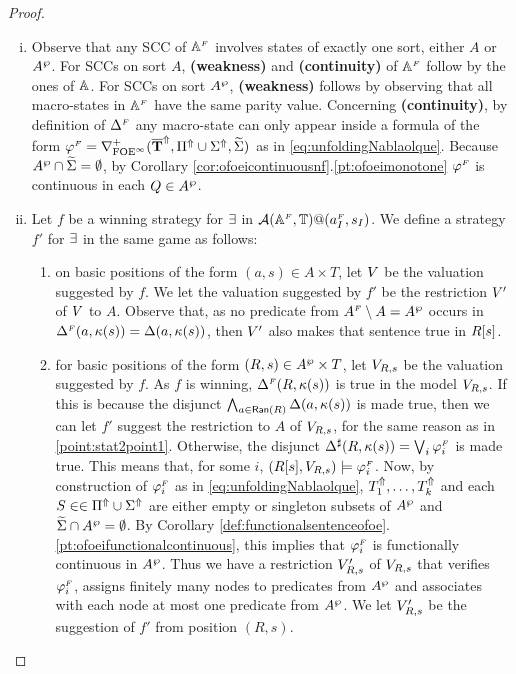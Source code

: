 \begin{proof}
\begin{enumerate}[(i)]
\item Observe that any SCC
of $\mathbb{A}^{{\scriptscriptstyle F}}$ involves states of exactly one sort, either $A$ or $A^{\wp}$. For SCCs on sort $A$, \textbf{(weakness)} and \textbf{(continuity)} of $\mathbb{A}^{{\scriptscriptstyle F}}$ follow by the ones of $\mathbb{A}$. For SCCs on sort $A^{\wp}$, \textbf{(weakness)} follows by observing that all macro-states in $\mathbb{A}^{{\scriptscriptstyle F}}$ have the same parity value. Concerning \textbf{(continuity)}, by definition of $\Delta^{{\scriptscriptstyle F}}$ any macro-state can only appear inside a formula of the form $\varphi^{{\scriptscriptstyle F}} = \nabla^+_{\mathrm{FOE}^{\infty}}(\overline{{\mathbf{T}}}^{\Uparrow},\Pi^{\Uparrow} \cup \Sigma^{\Uparrow},\widetilde{\Sigma})$ as in \eqref{eq:unfoldingNablaolque}. Because $A^{\wp} \cap \widetilde{\Sigma} = \emptyset$, by Corollary \ref{cor:ofoeicontinuousnf}.\ref{pt:ofoeimonotone} $\varphi^{{\scriptscriptstyle F}}$ is continuous in each $Q \in A^{\wp}$.
  \item  Let $f$ be a winning strategy for $\exists$ in $\mathcal{A}(\mathbb{A}^{{\scriptscriptstyle F}},\mathbb{T})@(a_I^{{\scriptscriptstyle F}},s_I)$. We define a strategy $f'$ for $\exists$ in the same game as follows:
      \begin{enumerate}[label=(\alph*),ref=\alph*]
        \item on basic positions of the form $(a,s) \in A\times T$, let $V$ be the valuation suggested by $f$. We let the valuation suggested by $f'$ be the restriction $V'$ of $V$ to $A$. Observe that, as no predicate from $A^{{\scriptscriptstyle F}}\setminus A =A^{\wp}$ occurs in $\Delta^{{\scriptscriptstyle F}}(a,\kappa(s)) = \Delta(a,\kappa(s))$, then $V'$ also makes that sentence true in $R[s]$.
        \label{point:stat2point1}
        \item for basic positions of the form $(R,s) \in A^{\wp} \times T$, let $V_{R,s}$ be the valuation suggested by $f$. As $f$ is winning, $\Delta^{{\scriptscriptstyle F}}(R,\kappa(s))$ is true in the model $V_{R,s}$. If this is because the disjunct $\bigwedge_{a \in \mathsf{Ran}(R)} \Delta(a,\kappa(s))$ is made true, then we can let $f'$ suggest the restriction to $A$ of $V_{R,s}$, for the same reason as in \eqref{point:stat2point1}. Otherwise, the disjunct $\Delta^{\sharp}(R,\kappa(s)) = \bigvee_{i}\varphi_i^{{\scriptscriptstyle F}}$ is made true. This means that, for some $i$, $(R[s], V_{R,s}) \models \varphi_i^{{\scriptscriptstyle F}}$.
             Now, by construction of $\varphi_i^{{\scriptscriptstyle F}}$ as in \eqref{eq:unfoldingNablaolque}, $T^{\Uparrow}_1,\dots,T^{\Uparrow}_k$ and each $S \in \in \Pi^{\Uparrow} \cup \Sigma^{\Uparrow}$ are either empty or singleton subsets of $A^{\wp}$ and $\widetilde{\Sigma} \cap A^{\wp} = \emptyset$. By Corollary \ref{def:functionalsentenceofoe}.\ref{pt:ofoeifunctionalcontinuous}, this implies that $\varphi_i^{{\scriptscriptstyle F}}$ is functionally continuous in $A^{\wp}$. Thus we have a restriction $V_{R,s}'$ of $V_{R,s}$ that verifies $\varphi_i^{{\scriptscriptstyle F}}$, assigns finitely many nodes to predicates from $A^{\wp}$ and associates with each node at most one predicate from $A^{\wp}$. We let $V_{R,s}'$ be the suggestion of $f'$ from position $(R,s)$.

\end{enumerate}
\end{enumerate}
\end{proof}
